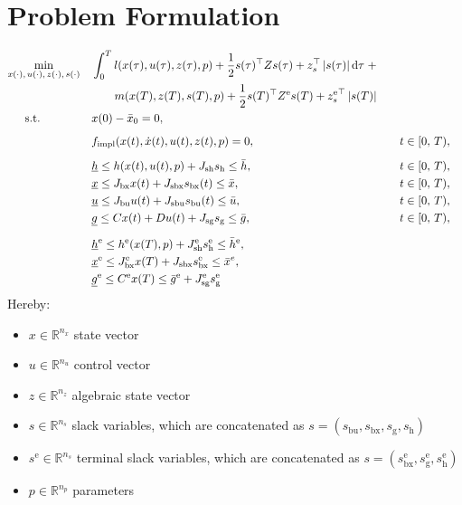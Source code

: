 \documentclass{article}
\newcommand{\tran}{^\top}
\newcommand{\abs}[1]{\left\lvert#1\right\rvert}
\newcommand{\ind}[1]{_{\textrm{#1}}}
\newcommand{\terminal}{^{\textrm{e}}}
\begin{document}
	

	
\section*{Problem Formulation}
	
\begin{align*}
&\underset{\begin{subarray}{c}
	x(\cdot),\,u(\cdot), \, z(\cdot), \, s(\cdot)
	\end{subarray}}{\min}
&&\int_0^T l(x(\tau), u(\tau), z(\tau), p)
 + \frac{1}{2} s(\tau)\tran Z s(\tau) + z_s\tran \abs{s(\tau)} \mathrm{d}\tau \; + \\
 &&& \quad \quad m(x(T), z(T), s(T), p) + \frac{1}{2} s(T)\tran Z\terminal s(T) + {z\terminal_s}\tran \abs{s(T)}\\
&\,\,\,\quad \text{s.t.}    &&x(0) - \bar{x}_0 = 0, &&\\
&&& && \\[-1em]
&&& f\ind{impl}(x(t), \dot{x}(t), u(t), z(t), p) = 0, &&\quad t \in [0,\,T),\\
&&& && \\[-1em]
&&&\underline{h} \leq h(x(t), u(t), p) + J_{\textrm{sh}} s_{\textrm{h}} \leq \bar{h}, &&\quad t \in [0,\,T),\\
&&&\underline{x} \leq J_{\textrm{bx}} x(t) + J_{\textrm{sbx}} s_{\textrm{bx}}(t) \leq \bar{x}, &&\quad t \in [0,\,T),\\
&&&\underline{u} \leq J_{\textrm{bu}} u(t) + J_{\textrm{sbu}} s_{\textrm{bu}}(t)\leq \bar{u}, &&\quad t \in [0,\,T),\\
&&&\underline{g} \leq Cx(t) + Du(t) + J_{\textrm{sg}} s_{\textrm{g}} \leq \bar{g}, &&\quad t \in [0,\,T), \\
&&& && \\[-1em]
&&&\underline{h}\terminal \leq h\terminal(x(T), p)  + J\ind{sh}\terminal s\ind{h}\terminal \leq \bar{h}\terminal, &&\\
&&&\underline{x}\terminal \leq J_{\textrm{bx}}\terminal x(T) + J\ind{sbx} s\ind{bx}\terminal \leq \bar{x}^{e}, &&\\ %
&&&\underline{g}\terminal \leq C\terminal x(T)\leq \bar{g}\terminal  + J\ind{sg}\terminal s\ind{g}\terminal
\end{align*}
Hereby:
\begin{itemize}
	\item $ x \in \mathbb{R}^{n_x} $ state vector
	\item $ u \in \mathbb{R}^{n_u} $ control vector
	\item $ z \in \mathbb{R}^{n_z} $ algebraic state vector
	\item $ s \in \mathbb{R}^{n_s} $ slack variables, which are concatenated as $ s = (s\ind{bu}, s\ind{bx}, s\ind{g}, s\ind{h}) $
	\item $ s\terminal \in \mathbb{R}^{n_s} $ terminal slack variables, which are concatenated as $ s = (s\ind{bx}\terminal, s\ind{g}\terminal, s\ind{h}\terminal) $
	\item $ p \in \mathbb{R}^{n_p} $ parameters
\end{itemize}
\end{document}
